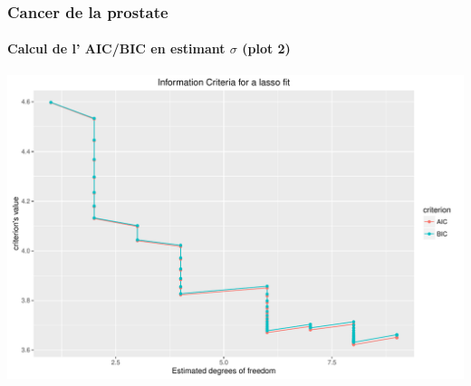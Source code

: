 \documentclass{beamer}\usepackage[]{graphicx}\usepackage[]{color}
\newenvironment{knitrout}{}{} %
\begin{document}
\begin{frame}[containsverbatim]
  \frametitle{Cancer de la prostate}
  \framesubtitle{Calcul de l' AIC/BIC en estimant $\sigma$ (plot 2)}

\begin{knitrout}\scriptsize
{}\color{fgcolor}
\includegraphics[width=\textwidth]{figures/crit_lassounnamed-chunk-71-1} 

\end{knitrout}
\end{frame}
\end{document}
